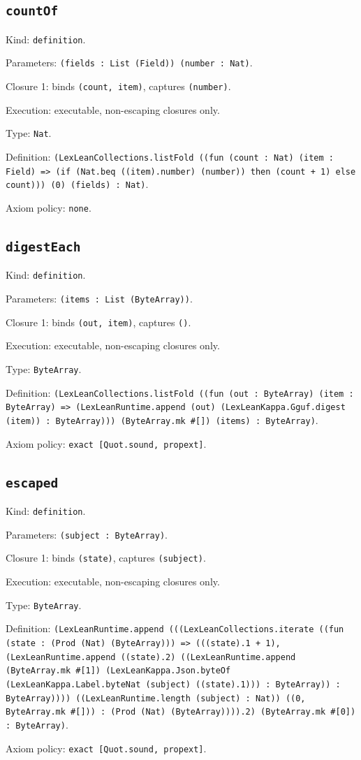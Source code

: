 \documentclass[11pt]{article}
\begin{document}
\subsection*{\texttt{countOf}}
\noindent Kind: \texttt{definition}.\par
\noindent Parameters: \texttt{(fields : List (Field)) (number : Nat)}.\par
\noindent Closure 1: binds \texttt{(count, item)}, captures \texttt{(number)}.\par
\noindent Execution: executable, non-escaping closures only.\par
\noindent Type: \texttt{Nat}.\par
\noindent Definition: \texttt{(LexLeanCollections.listFold ((fun (count : Nat) (item : Field) => (if (Nat.beq ((item).number) (number)) then (count + 1) else count))) (0) (fields) : Nat)}.\par
\noindent Axiom policy: \texttt{none}.\par
\subsection*{\texttt{digestEach}}
\noindent Kind: \texttt{definition}.\par
\noindent Parameters: \texttt{(items : List (ByteArray))}.\par
\noindent Closure 1: binds \texttt{(out, item)}, captures \texttt{()}.\par
\noindent Execution: executable, non-escaping closures only.\par
\noindent Type: \texttt{ByteArray}.\par
\noindent Definition: \texttt{(LexLeanCollections.listFold ((fun (out : ByteArray) (item : ByteArray) => (LexLeanRuntime.append (out) (LexLeanKappa.Gguf.digest (item)) : ByteArray))) (ByteArray.mk \#[]) (items) : ByteArray)}.\par
\noindent Axiom policy: \texttt{exact [Quot.sound, propext]}.\par
\subsection*{\texttt{escaped}}
\noindent Kind: \texttt{definition}.\par
\noindent Parameters: \texttt{(subject : ByteArray)}.\par
\noindent Closure 1: binds \texttt{(state)}, captures \texttt{(subject)}.\par
\noindent Execution: executable, non-escaping closures only.\par
\noindent Type: \texttt{ByteArray}.\par
\noindent Definition: \texttt{(LexLeanRuntime.append (((LexLeanCollections.iterate ((fun (state : (Prod (Nat) (ByteArray))) => (((state).1 + 1), (LexLeanRuntime.append ((state).2) ((LexLeanRuntime.append (ByteArray.mk \#[1]) (LexLeanKappa.Json.byteOf (LexLeanKappa.Label.byteNat (subject) ((state).1))) : ByteArray)) : ByteArray)))) ((LexLeanRuntime.length (subject) : Nat)) ((0, ByteArray.mk \#[])) : (Prod (Nat) (ByteArray)))).2) (ByteArray.mk \#[0]) : ByteArray)}.\par
\noindent Axiom policy: \texttt{exact [Quot.sound, propext]}.\par
\end{document}
